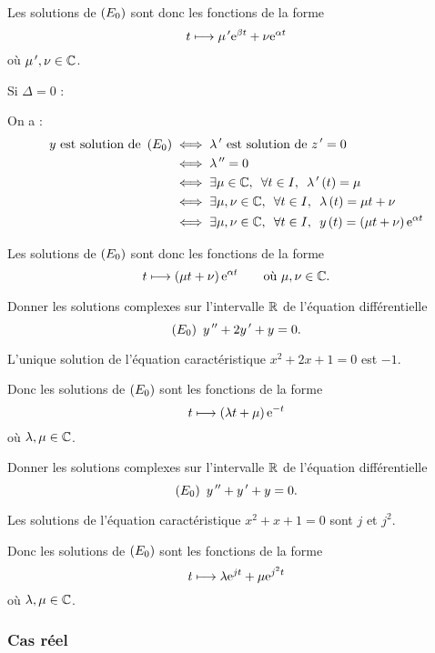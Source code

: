 \begin{dem}
Les solutions de \(\left(E_0\right)\) sont donc les fonctions de la forme \[t\longmapsto\mu^{\,\prime}\mathrm{e}^{\beta t}+\nu\mathrm{e}^{\alpha t}\] où \(\mu^{\,\prime},\nu\in\mathbb{C}\).

Si \(\Delta=0\) :

On a : \[\begin{aligned}
y\text{ est solution de }\paren{E_0}&\ssi\lambda\prim\text{ est solution de }z\prim=0 \\
&\ssi\lambda\seconde=0 \\
&\ssi\quantifs{\exists\mu\in\C;\forall t\in I}\lambda\prim\paren{t}=\mu \\
&\ssi\quantifs{\exists\mu,\nu\in\C;\forall t\in I}\lambda\paren{t}=\mu t+\nu \\
&\ssi\quantifs{\exists\mu,\nu\in\C;\forall t\in I}y\paren{t}=\paren{\mu t+\nu}\e{\alpha t}
\end{aligned}\]

Les solutions de \(\left(E_0\right)\) sont donc les fonctions de la forme \[t\longmapsto\left(\mu t+\nu\right)\mathrm{e}^{\alpha t}\qquad\text{où }\mu,\nu\in\mathbb{C}.\]
\end{dem}

\begin{exoex}
Donner les solutions complexes sur l'intervalle \(\mathbb{R}\) de l'équation différentielle \[\left(E_0\right)~y^{\,\prime\prime}+2y^{\,\prime}+y=0.\]
\end{exoex}

\begin{corr}
L'unique solution de l'équation caractéristique \(x^2+2x+1=0\) est \(-1\).

Donc les solutions de \(\left(E_0\right)\) sont les fonctions de la forme \[t\longmapsto\left(\lambda t+\mu\right)\mathrm{e}^{-t}\] où \(\lambda,\mu\in\mathbb{C}\).
\end{corr}

\begin{exoex}
Donner les solutions complexes sur l'intervalle \(\mathbb{R}\) de l'équation différentielle \[\left(E_0\right)~y^{\,\prime\prime}+y^{\,\prime}+y=0.\]
\end{exoex}

\begin{corr}
Les solutions de l'équation caractéristique \(x^2+x+1=0\) sont \(j\) et \(j^2\).

Donc les solutions de \(\left(E_0\right)\) sont les fonctions de la forme \[t\longmapsto\lambda\mathrm{e}^{jt}+\mu\mathrm{e}^{j^2t}\] où \(\lambda,\mu\in\mathbb{C}\).
\end{corr}

\subsubsection{Cas réel}

